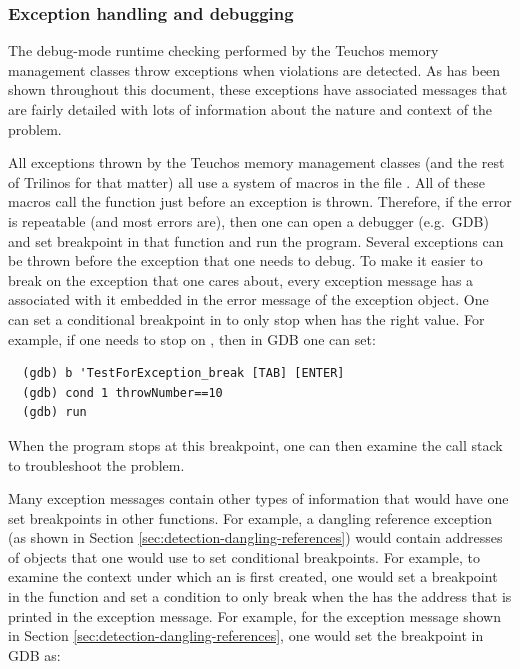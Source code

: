 \documentclass[pdf,ps2pdf,11pt]{SANDreport}
\begin{document}
%
{}\subsubsection{Exception handling and debugging}
\label{sec:except-handling-debugging}
%

The debug-mode runtime checking performed by the Teuchos memory
management classes throw exceptions when violations are detected.  As
has been shown throughout this document, these exceptions have
associated messages that are fairly detailed with lots of information
about the nature and context of the problem.

All exceptions thrown by the Teuchos memory management classes (and
the rest of Trilinos for that matter) all use a system of macros in
the file {}.  All of these macros
call the function {} just before an
exception is thrown.  Therefore, if the error is repeatable (and most
errors are), then one can open a debugger (e.g.\ GDB) and set
breakpoint in that function and run the program.  Several exceptions
can be thrown before the exception that one needs to debug.  To make
it easier to break on the exception that one cares about, every
exception message has a {} associated with it
embedded in the error message of the exception object.  One can set a
conditional breakpoint in {} to only
stop when {} has the right value.  For example, if
one needs to stop on {}, then in GDB one can
set:

{\small\begin{verbatim}
  (gdb) b 'TestForException_break [TAB] [ENTER]
  (gdb) cond 1 throwNumber==10
  (gdb) run
\end{verbatim}}

When the program stops at this breakpoint, one can then examine the
call stack to troubleshoot the problem.

Many exception messages contain other types of information that would
have one set breakpoints in other functions.  For example, a dangling
reference exception (as shown in Section
{}\ref{sec:detection-dangling-references}) would contain addresses of
objects that one would use to set conditional breakpoints.  For
example, to examine the context under which an {} is
first created, one would set a breakpoint in the function
{} and set a condition
to only break when the {} has the address that is printed
in the exception message.  For example, for the exception message
shown in Section {}\ref{sec:detection-dangling-references}, one would
set the breakpoint in GDB as:
\end{document}
